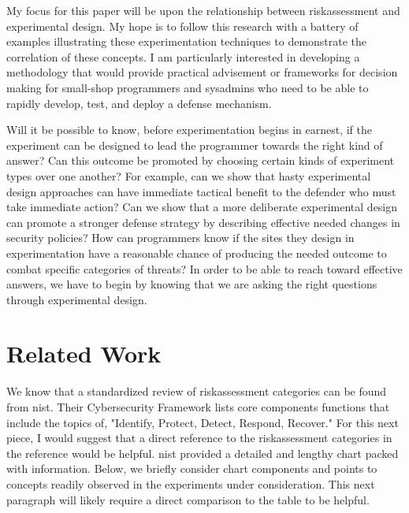 My focus for this paper will be upon the relationship between \gls{riskassessment} and experimental design.  My hope is to follow this research with a battery of examples illustrating these experimentation techniques to demonstrate the correlation of these concepts. I am particularly interested in developing a methodology that would provide practical advisement or frameworks for decision making for small-shop programmers and sysadmins who need to be able to rapidly develop, test, and deploy a defense mechanism.

Will it be possible to know, before experimentation begins in earnest, if the experiment can be designed to lead the programmer towards the right kind of answer?  Can this outcome be promoted by choosing certain kinds of experiment types over one another?  For example, can we show that hasty experimental design approaches can have immediate tactical benefit to the defender who must take immediate action?  Can we show that a more deliberate experimental design can promote a stronger defense strategy by describing effective needed changes in security policies?  How can programmers know if the sites they design in experimentation have a reasonable chance of producing the needed outcome to combat specific categories of threats?  In order to be able to reach toward effective answers, we have to begin by knowing that we are asking the right questions through experimental design.



\section{Related Work}

We know that a standardized review of  \gls{riskassessment} categories can be found from  \gls{nist}.  Their Cybersecurity Framework lists core components functions that include the topics of, "Identify, Protect, Detect, Respond, Recover."    For this next piece, I would suggest that a direct reference to the  \gls{riskassessment} categories in the reference would be helpful.   \gls{nist} provided a detailed and lengthy chart packed with information.  Below, we briefly consider chart components and points to concepts readily observed in the experiments under consideration.  This next paragraph will likely require a direct comparison to the table  to be helpful.

